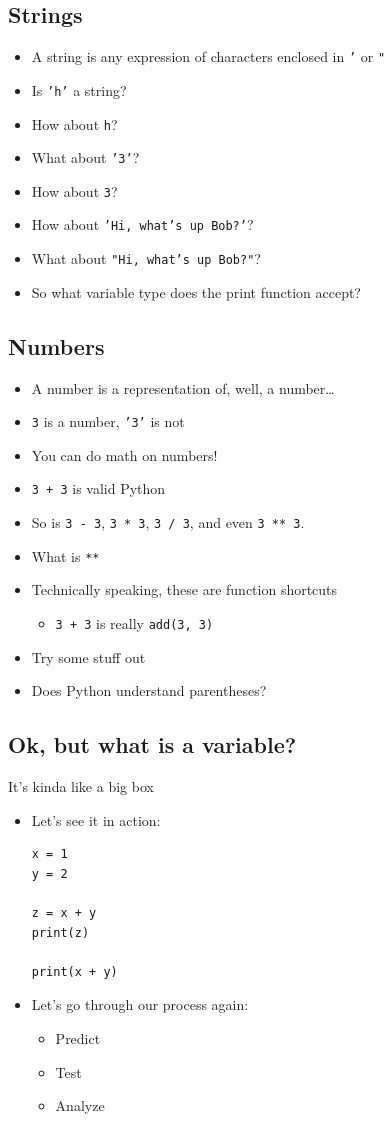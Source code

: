 \documentclass[11pt]{article}
\begin{document}
\subsection{Strings}
\label{sec:orgac1de59}
\begin{itemize}
\item A string is any expression of characters enclosed in \texttt{'} or \texttt{"}
\item Is \texttt{'h'} a string?
\item How about \texttt{h}?
\item What about \texttt{'3'}?
\item How about \texttt{3}?
\item How about \texttt{'Hi, what's up Bob?'}?
\item What about \texttt{"Hi, what's up Bob?"}?
\item So what variable type does the print function accept?
\end{itemize}
\subsection{Numbers}
\label{sec:orgac538f5}
\begin{itemize}
\item A number is a representation of, well, a number\ldots{}
\item \texttt{3} is a number, \texttt{'3'} is not
\item You can do math on numbers!
\item \texttt{3 + 3} is valid Python
\item So is \texttt{3 - 3}, \texttt{3 * 3}, \texttt{3 / 3}, and even \texttt{3 ** 3}.
\item What is \texttt{**}
\item Technically speaking, these are function shortcuts
\begin{itemize}
\item \texttt{3 + 3} is really \texttt{add(3, 3)}
\end{itemize}
\item Try some stuff out
\item Does Python understand parentheses?
\end{itemize}
\subsection{Ok, but what is a variable?}
\label{sec:orge21087e}
It's kinda like a big box

\begin{itemize}
\item Let's see it in action:
\begin{verbatim}
x = 1
y = 2

z = x + y
print(z)

print(x + y)
\end{verbatim}

\item Let's go through our process again:
\begin{itemize}
\item Predict
\item Test
\item Analyze
\end{itemize}
\end{itemize}
\end{document}
